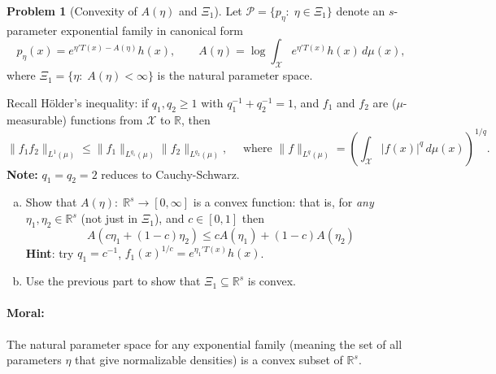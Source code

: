 \documentclass{article}
\newcommand{\cP}{\mathcal{P}}
\newcommand{\cX}{\mathcal{X}}
\newcommand{\RR}{\mathbb{R}}
\theoremstyle{definition}
\newtheorem{problem}{Problem}
\begin{document}
\begin{problem}[Convexity of $A(\eta)$ and $\Xi_1$]
\label{prob:convexity-expfam}
Let $\cP=\{p_\eta:\; \eta \in \Xi_1\}$ denote an $s$-parameter exponential family in canonical form
\[
p_\eta(x) = e^{\eta'T(x) - A(\eta)}h(x), \qquad A(\eta) = \log\int_{\cX} e^{\eta'T(x)}h(x)\,d \mu(x),
\]
where $\Xi_1=\{\eta:\; A(\eta) < \infty\}$ is the natural parameter space. 

Recall H\"{o}lder's inequality: if $q_1,q_2\geq 1$ with $q_1^{-1} + q_2^{-1} = 1$, and $f_1$ and $f_2$ are ($\mu$-measurable) functions from $\cX$ to $\RR$, then
\[
\|f_1f_2\|_{L^1(\mu)} \leq \|f_1\|_{L^{q_1}(\mu)}\|f_2\|_{L^{q_2}(\mu)}, \quad \text{ where } \|f\|_{L^{q}(\mu)} = \left(\int_{\cX} |f(x)|^q\,d \mu(x)\right)^{1/q}.
\]
{\bf Note:} $q_1=q_2=2$ reduces to Cauchy-Schwarz.


\begin{enumerate}[(a)]
\item Show that $A(\eta):\;\RR^s \to [0,\infty]$ is a convex function: that is, for {\em any} $\eta_1,\eta_2\in \RR^s$ (not just in $\Xi_1$), and $c\in [0,1]$ then
  \begin{equation}\label{eq:ineq}
  A(c\eta_1 + (1-c)\eta_2) \leq c A(\eta_1) + (1-c) A(\eta_2)
  \end{equation}
  {\bf Hint}: try $q_1=c^{-1}$, $f_1(x)^{1/c}=e^{\eta_1'T(x)}h(x)$.

  


\item Use the previous part to show that $\Xi_1\subseteq \RR^s$ is convex. 

  
  


\end{enumerate}

\paragraph{Moral:} The natural parameter space for any exponential family (meaning the set of all parameters $\eta$ that give normalizable densities) is a convex subset of $\RR^s$.


\end{problem}
\end{document}
